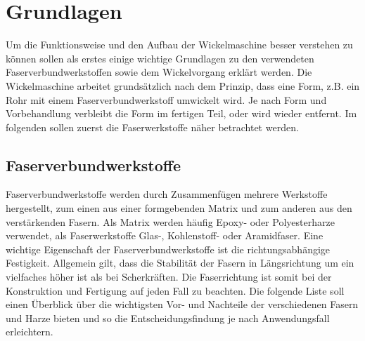 \documentclass[12pt, a4paper, ngerman]{article}
\begin{document}
\section{Grundlagen}
Um die Funktionsweise und den Aufbau der Wickelmaschine besser verstehen zu können sollen als erstes einige wichtige Grundlagen zu den verwendeten Faserverbundwerkstoffen sowie dem Wickelvorgang erklärt werden. Die Wickelmaschine arbeitet grundsätzlich nach dem Prinzip, dass eine Form, z.B. ein Rohr mit einem Faserverbundwerkstoff umwickelt wird. Je nach Form und Vorbehandlung verbleibt die Form im fertigen Teil, oder wird wieder entfernt. Im folgenden sollen zuerst die Faserwerkstoffe näher betrachtet werden.

\subsection{Faserverbundwerkstoffe}
Faserverbundwerkstoffe werden durch Zusammenfügen mehrere Werkstoffe hergestellt, zum einen aus einer formgebenden Matrix und zum anderen aus den verstärkenden Fasern. Als Matrix werden häufig Epoxy- oder Polyesterharze verwendet, als Faserwerkstoffe Glas-, Kohlenstoff- oder Aramidfaser. Eine wichtige Eigenschaft der Faserverbundwerkstoffe ist die richtungsabhängige Festigkeit. Allgemein gilt, dass die Stabilität der Fasern in Längsrichtung um ein vielfaches höher ist als bei Scherkräften. Die Faserrichtung ist somit bei der Konstruktion und Fertigung auf jeden Fall zu beachten.  Die folgende Liste soll einen Überblick über die wichtigsten Vor- und Nachteile der verschiedenen Fasern und Harze bieten und so die Entscheidungsfindung je nach Anwendungsfall erleichtern.
\end{document}
